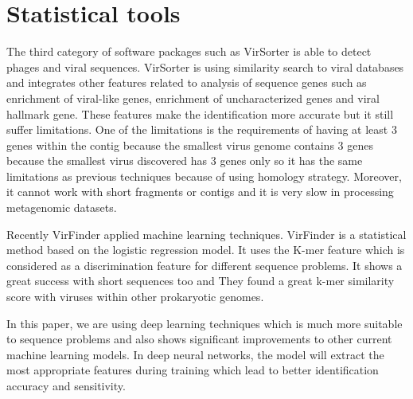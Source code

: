 \section{Statistical tools}


The third category of software packages such as VirSorter \cite{roux2015virsorter} is able to detect phages and viral sequences. VirSorter is using similarity search to viral databases and integrates other features related to analysis of sequence genes such as enrichment of viral-like genes, enrichment of uncharacterized genes and viral hallmark gene. These features make the identification more accurate but it still suffer limitations. One of the limitations is the requirements of having at least 3 genes within the contig because the smallest virus genome contains 3 genes because the smallest virus discovered has 3 genes only so it has the same limitations as previous techniques because of using homology strategy. Moreover, it cannot work with short fragments or contigs and it is very slow in processing metagenomic datasets. 

Recently VirFinder \cite{ren2017virfinder} applied machine learning techniques. VirFinder is a statistical method based on the logistic regression model. It uses the K-mer feature which is considered as a discrimination feature for different sequence problems. It shows a great success with short sequences too and They found a great k-mer similarity score with viruses within other prokaryotic genomes. 


In this paper, we are using deep learning techniques which is much more suitable to sequence problems and also shows significant improvements to other current machine learning models. In deep neural networks, the model will extract the most appropriate features during training which lead to better identification accuracy and sensitivity. 

